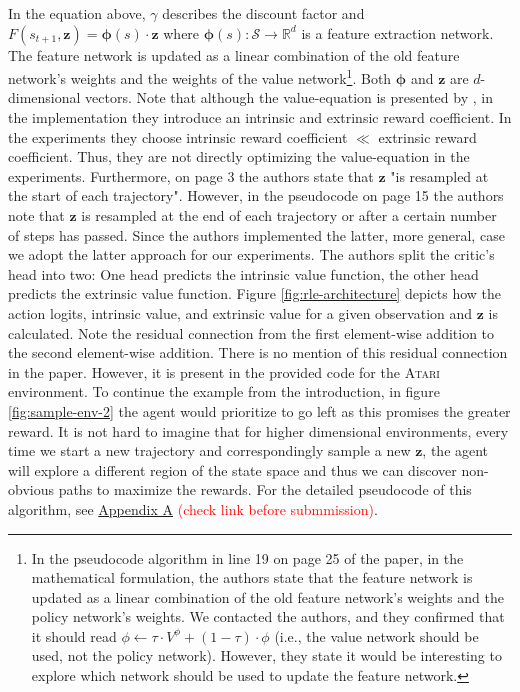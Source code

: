 \documentclass[10pt]{article} %
\begin{document}
\noindent In the equation above, $\gamma$ describes the discount factor and $F(s_{t+1}, \textbf{z}) =  \boldsymbol{\phi}(s) \cdot \textbf{z}$ where $\boldsymbol{\phi}(s): \mathcal{S} \rightarrow \mathbb{R}^{d}$ is a feature extraction network. The feature network is updated as a linear combination of the old feature network's weights and the weights of the value network\footnote{In the pseudocode algorithm in line 19 on page 25 of the paper, in the mathematical formulation, the authors state that the feature network is updated as a linear combination of the old feature network's weights and the policy network's weights. We contacted the authors, and they confirmed that it should read $\phi \leftarrow \tau \cdot V^\phi + (1 - \tau ) \cdot \phi$ (i.e., the value network should be used, not the policy network). However, they state it would be interesting to explore which network should be used to update the feature network.}. Both $\boldsymbol{\phi}$ and $\textbf{z}$ are $d$-dimensional vectors. Note that although the value-equation is presented by \cite{rle-paper}, in the implementation they introduce an intrinsic and extrinsic reward coefficient. In the experiments they choose intrinsic reward coefficient $\ll$ extrinsic reward coefficient. Thus, they are not directly optimizing the value-equation in the experiments. Furthermore, on page 3 the authors state that $\textbf{z}$ "is resampled at the start of each trajectory". However, in the pseudocode on page 15 the authors note that $\textbf{z}$ is resampled at the end of each trajectory or after a certain number of steps has passed. Since the authors implemented the latter, more general, case we adopt the latter approach for our experiments. The authors split the critic's head into two: One head predicts the intrinsic value function, the other head predicts the extrinsic value function. Figure \ref{fig:rle-architecture} depicts how the action logits, intrinsic value, and extrinsic value for a given observation and $\textbf{z}$ is calculated. Note the residual connection from the first element-wise addition to the second element-wise addition. There is no mention of this residual connection in the paper. However, it is present in the provided code for the \textsc{Atari} environment. To continue the example from the introduction, in figure \ref{fig:sample-env-2} the agent would prioritize to go left as this promises the greater reward. It is not hard to imagine that for higher dimensional environments, every time we start a new trajectory and correspondingly sample a new $\textbf{z}$, the agent will explore a different region of the state space and thus we can discover non-obvious paths to maximize the rewards. For the detailed pseudocode of this algorithm, see \hyperlink{algo-rle}{Appendix A} \textcolor{red}{(check link before submmission)}.
\end{document}
